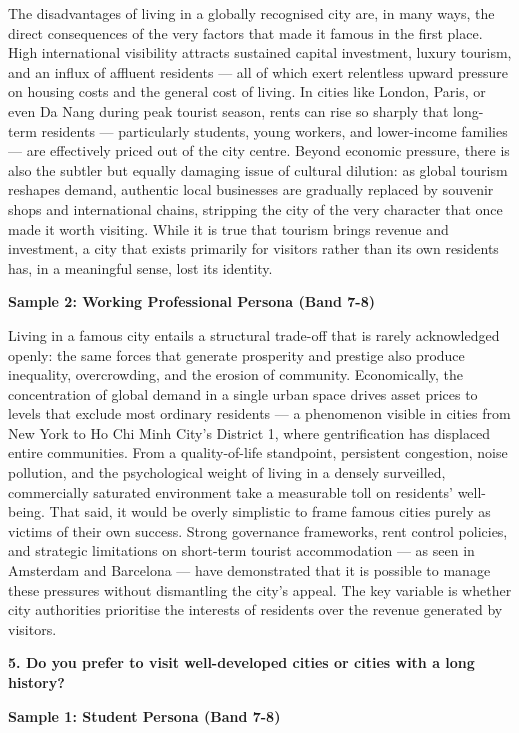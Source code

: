 The disadvantages of living in a globally recognised city are, in many ways, the direct consequences of the very factors that made it famous in the first place. High international visibility attracts sustained capital investment, luxury tourism, and an influx of affluent residents — all of which exert relentless upward pressure on housing costs and the general cost of living. In cities like London, Paris, or even Da Nang during peak tourist season, rents can rise so sharply that long-term residents — particularly students, young workers, and lower-income families — are effectively priced out of the city centre. Beyond economic pressure, there is also the subtler but equally damaging issue of cultural dilution: as global tourism reshapes demand, authentic local businesses are gradually replaced by souvenir shops and international chains, stripping the city of the very character that once made it worth visiting. While it is true that tourism brings revenue and investment, a city that exists primarily for visitors rather than its own residents has, in a meaningful sense, lost its identity.

\textbf{Sample 2: Working Professional Persona (Band 7-8)}

Living in a famous city entails a structural trade-off that is rarely acknowledged openly: the same forces that generate prosperity and prestige also produce inequality, overcrowding, and the erosion of community. Economically, the concentration of global demand in a single urban space drives asset prices to levels that exclude most ordinary residents — a phenomenon visible in cities from New York to Ho Chi Minh City's District 1, where gentrification has displaced entire communities. From a quality-of-life standpoint, persistent congestion, noise pollution, and the psychological weight of living in a densely surveilled, commercially saturated environment take a measurable toll on residents' well-being. That said, it would be overly simplistic to frame famous cities purely as victims of their own success. Strong governance frameworks, rent control policies, and strategic limitations on short-term tourist accommodation — as seen in Amsterdam and Barcelona — have demonstrated that it is possible to manage these pressures without dismantling the city's appeal. The key variable is whether city authorities prioritise the interests of residents over the revenue generated by visitors.

\separator

\begin{ieltsquestion}
\textbf{5. Do you prefer to visit well-developed cities or cities with a long history?}
\end{ieltsquestion}
\textbf{Sample 1: Student Persona (Band 7-8)}

